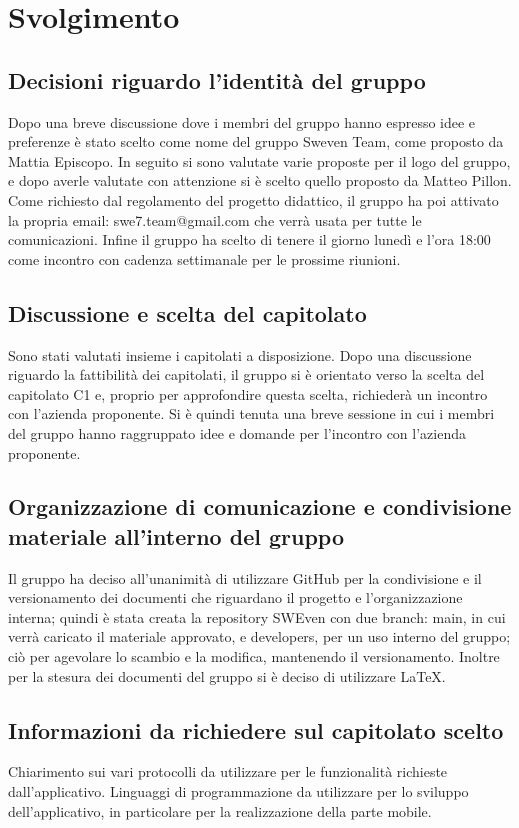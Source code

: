 \section{Svolgimento}
	\subsection{Decisioni riguardo l'identità del gruppo}
	Dopo una breve discussione dove i membri del gruppo hanno espresso idee e preferenze è stato scelto come nome del gruppo Sweven Team, come proposto da Mattia Episcopo. In seguito si sono valutate varie proposte per il logo del gruppo, e dopo averle valutate con attenzione si è scelto quello proposto da Matteo Pillon. Come richiesto dal regolamento del progetto didattico, il gruppo ha poi attivato la propria email: swe7.team@gmail.com che verrà usata per tutte le comunicazioni. Infine il gruppo ha scelto di tenere il giorno lunedì e l'ora 18:00 come incontro con cadenza settimanale per le prossime riunioni.
	\subsection{Discussione e scelta del capitolato}
	Sono stati valutati insieme i capitolati a disposizione. Dopo una discussione riguardo la fattibilità dei capitolati, il gruppo si è orientato verso la scelta del capitolato C1 e, proprio per approfondire questa scelta, richiederà un incontro con l'azienda proponente. Si è quindi tenuta una breve sessione in cui i membri del gruppo hanno raggruppato idee e domande per l'incontro con l'azienda proponente.
	\subsection{Organizzazione di comunicazione e condivisione materiale all'interno del gruppo}
	Il gruppo ha deciso all'unanimità di utilizzare GitHub per la condivisione e il versionamento dei documenti che riguardano il progetto e l'organizzazione interna; quindi è stata creata la repository SWEven con due branch: main, in cui verrà caricato il materiale approvato, e developers, per un uso interno del gruppo; ciò per agevolare lo scambio e la modifica, mantenendo il versionamento. Inoltre per la stesura dei documenti del gruppo si è deciso di utilizzare \LaTeX .
	\subsection{Informazioni da richiedere sul capitolato scelto}
	Chiarimento sui vari protocolli da utilizzare per le funzionalità richieste dall'applicativo.
	Linguaggi di programmazione da utilizzare per lo sviluppo dell'applicativo, in particolare per la realizzazione della parte mobile.


